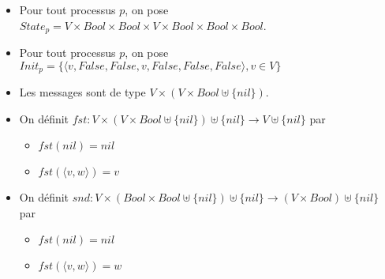 \documentclass{article}
\begin{document}
\begin{itemize}

	\item Pour tout processus $p$, on pose
		$State_p = V \times Bool \times Bool \times V \times Bool \times Bool \times Bool$.
	\item Pour tout processus $p$, on pose
		$Init_p = \{\langle v, False, False, v, False, False, False \rangle, v \in V\}$
	\item Les messages sont de type $V \times (V \times Bool \uplus \{nil\})$.


	\item On définit $fst : V \times (V \times Bool \uplus \{nil\}) \uplus \{nil\} \rightarrow V \uplus \{nil\}$ par
	\begin{itemize}
		\item $fst(nil) = nil$
		\item $fst(\langle v, w \rangle) = v$
	\end{itemize}

	\item On définit $snd : V \times (Bool \times Bool \uplus \{nil\}) \uplus \{nil\} \rightarrow (V \times Bool) \uplus \{nil\}$ par
	\begin{itemize}
		\item $fst(nil) = nil$
		\item $fst(\langle v, w \rangle) = w$
	\end{itemize}
\end{itemize}
\end{document}

